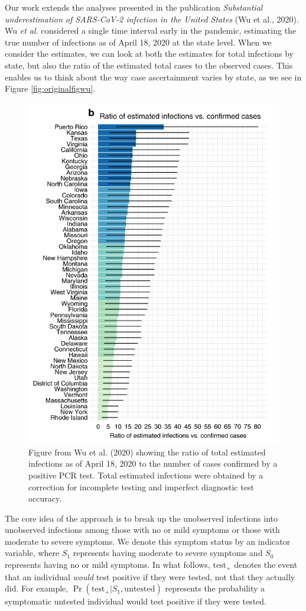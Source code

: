 \documentclass[12pt,twoside]{smiththesis}
\begin{document}
Our work extends the analyses presented in the publication \emph{Substantial underestimation of SARS-CoV-2 infection in the United States} (Wu et al., 2020). Wu \emph{et al.} considered a single time interval early in the pandemic, estimating the true number of infections as of April 18, 2020 at the state level. When we consider the estimates, we can look at both the estimates for total infections by state, but also the ratio of the estimated total cases to the observed cases. This enables us to think about the way case ascertainment varies by state, as we see in Figure
\ref{fig:originalfigwu}.
\begin{figure}
\includegraphics[width=0.5\linewidth]{./figure/figure_original_case_ratio} \caption{\label{fig:originalfigwu}Figure from Wu et al. (2020) showing the ratio of total estimated infections as of April 18, 2020 to the number of cases confirmed by a positive PCR test. Total estimated infections were obtained by a correction for incomplete testing and imperfect diagnostic test accuracy.}\label{fig:unnamed-chunk-7}
\end{figure}
The core idea of the approach is to break up the unobserved infections into unobserved infections among those with no or mild symptoms or those with moderate to severe symptoms. We denote this symptom status by an indicator variable, where \(S_1\) represents having moderate to severe symptoms and \(S_0\) represents having no or mild symptoms. In what follows, \(\text{test}_+\) denotes the event that an individual \emph{would} test positive if they were tested, not that they actually did. For example, \(\Pr(\text{test}_+|S_1,\text{untested})\) represents the probability a symptomatic untested individual would test positive if they were tested.
\end{document}
